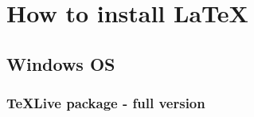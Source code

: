 \chapter{How to install \LaTeX} 

\section*{Windows OS}

\subsection*{TeXLive package - full version}
